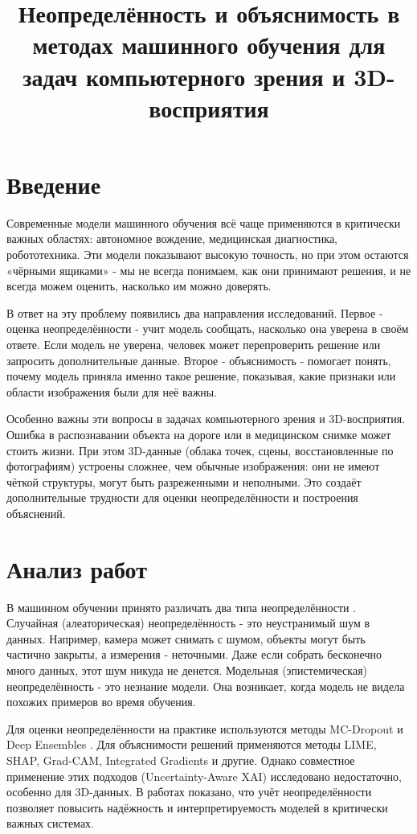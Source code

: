 \documentclass{misisarticle}
\title{Неопределённость и объяснимость в методах машинного обучения для задач компьютерного зрения и 3D-восприятия}
\begin{document}
\maketitle

\section{Введение}
Современные модели машинного обучения всё чаще применяются в критически важных областях: автономное вождение, медицинская диагностика, робототехника. Эти модели показывают высокую точность, но при этом остаются «чёрными ящиками» - мы не всегда понимаем, как они принимают решения, и не всегда можем оценить, насколько им можно доверять.

В ответ на эту проблему появились два направления исследований. Первое - оценка неопределённости - учит модель сообщать, насколько она уверена в своём ответе. Если модель не уверена, человек может перепроверить решение или запросить дополнительные данные. Второе - объяснимость - помогает понять, почему модель приняла именно такое решение, показывая, какие признаки или области изображения были для неё важны.

Особенно важны эти вопросы в задачах компьютерного зрения и 3D-восприятия. Ошибка в распознавании объекта на дороге или в медицинском снимке может стоить жизни. При этом 3D-данные (облака точек, сцены, восстановленные по фотографиям) устроены сложнее, чем обычные изображения: они не имеют чёткой структуры, могут быть разреженными и неполными. Это создаёт дополнительные трудности для оценки неопределённости и построения объяснений.

\section{Анализ работ}
В машинном обучении принято различать два типа неопределённости \cite{ref1}. Случайная (алеаторическая) неопределённость - это неустранимый шум в данных. Например, камера может снимать с шумом, объекты могут быть частично закрыты, а измерения - неточными. Даже если собрать бесконечно много данных, этот шум никуда не денется. Модельная (эпистемическая) неопределённость - это незнание модели. Она возникает, когда модель не видела похожих примеров во время обучения. 

Для оценки неопределённости на практике используются методы MC-Dropout и Deep Ensembles \cite{ref2}. Для объяснимости решений применяются методы LIME, SHAP, Grad-CAM, Integrated Gradients и другие. Однако совместное применение этих подходов (Uncertainty-Aware XAI) исследовано недостаточно, особенно для 3D-данных. В работах \cite{ref3} показано, что учёт неопределённости позволяет повысить надёжность и интерпретируемость моделей в критически важных системах.
\end{document}
